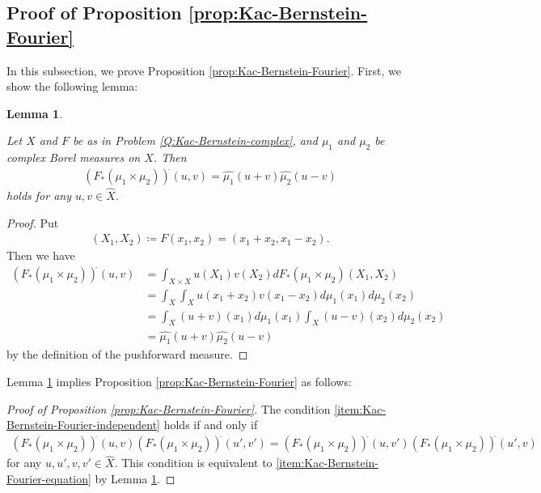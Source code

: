 \documentclass[12pt]{article}
\newtheorem{lemma}[theorem]{Lemma}
\theoremstyle{definition}
\theoremstyle{remark}
\numberwithin{equation}{section}
\numberwithin{figure}{section}
\numberwithin{table}{section}
\begin{document}
\subsection{Proof of Proposition \ref{prop:Kac-Bernstein-Fourier}}
\label{subsec:Kac-Bernstein-Fourier}

In this subsection, we prove Proposition \ref{prop:Kac-Bernstein-Fourier}.
First, we show the following lemma:

\begin{lemma}
    \label{lem:pushforward-Fourier}

Let $ X $ and $ F $ be as in Problem \ref{Q:Kac-Bernstein-complex}, and $ \mu_1 $ and $ \mu_2 $ be complex Borel measures on $ X $.
Then
\begin{align}
    ( F_* ( \mu_1 \times \mu_2 ) )^{ \hat{ } } ( u , v ) = \hat{ \mu_1 } ( u + v ) \hat{ \mu_2 } ( u - v )
\end{align}
holds for any $ u , v \in \hat{ X } $.

\end{lemma}

\begin{proof}

Put
\begin{align}
    ( X_1 , X_2 ) 
    \coloneqq F ( x_1 , x_2 )
    = ( x_1 + x_2 , x_1 - x_2 ).
\end{align}
Then we have
\begin{align}
    ( F_* ( \mu_1 \times \mu_2 ) )^{ \hat{ } } ( u , v )
    & = \int_{ X \times X } u ( X_1 ) v ( X_2 ) dF_* ( \mu_1 \times \mu_2 ) ( X_1 , X_2 ) \\
    & = \int_{ X } \int_{ X } u ( x_1 + x_2 ) v ( x_1 - x_2 ) d \mu_1 ( x_1 ) d \mu_2 ( x_2 ) \\
    & = \int_{ X } ( u + v ) ( x_1 ) d \mu_1 ( x_1 ) \int_{ X } ( u - v ) ( x_2 ) d \mu_2 ( x_2 ) \\
    & = \hat{ \mu_1 } ( u + v ) \hat{ \mu_2 } ( u - v )
\end{align}
by the definition of the pushforward measure.
\end{proof}

Lemma \ref{lem:pushforward-Fourier} implies Proposition \ref{prop:Kac-Bernstein-Fourier} as follows:

\begin{proof}[Proof of Proposition \ref{prop:Kac-Bernstein-Fourier}]

The condition \ref{item:Kac-Bernstein-Fourier-independent} holds if and only if
\begin{align}
    ( F_* ( \mu_1 \times \mu_2 ) )^{ \hat{ } } ( u , v ) ( F_* ( \mu_1 \times \mu_2 ) )^{ \hat{ } } ( u' , v' )
    = ( F_* ( \mu_1 \times \mu_2 ) )^{ \hat{ } } ( u , v' ) ( F_* ( \mu_1 \times \mu_2 ) )^{ \hat{ } } ( u' , v )
\end{align}
for any $ u , u' , v , v' \in \hat{ X } $.
This condition is equivalent to \ref{item:Kac-Bernstein-Fourier-equation} by Lemma \ref{lem:pushforward-Fourier}.
\end{proof}
\end{document}
